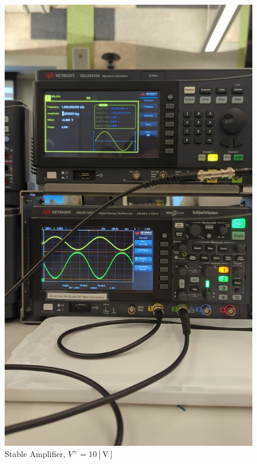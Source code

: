 \documentclass[
	letterpaper, %
	10pt, %
]{CSUniSchoolLabReport}
\begin{document}
\begin{figure}[H]
  \centering
  \includegraphics[width=.9\textwidth]{Figures/L4F4}
  \caption{Stable Amplifier, $V^{+}=10[\si{\volt}]$}
  \label{fig:6}
\end{figure}
\end{document}
